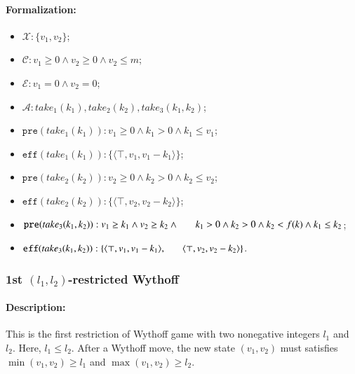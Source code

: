 \documentclass[review]{elsarticle}
\newcommand{\set}[1]{\{ #1 \}}
\newcommand{\tuple}[1]{\langle {#1} \rangle}
\newcommand{\true}{\top}
\newcommand{\statevar}{\mathcal{X}}
\newcommand{\act}{\mathcal{A}}
\newcommand{\constraint}{\mathcal{C}}
\newcommand{\estate}{\mathcal{E}}
\newcommand{\pre}{\mathtt{pre}}
\newcommand{\eff}{\mathtt{eff}}
\begin{document}
\paragraph{Formalization:}
\begin{itemize}
	\item $\statevar: \set{v_1, v_2}$;
	\item $\constraint: v_1 \ge 0 \wedge v_2 \ge 0 \wedge v_2 \le m$;
	\item $\estate: v_1=0 \wedge v_2 = 0$;
	\item $\act:take_1(k_1), take_2(k_2), take_3(k_1,k_2)$;
	\item $\pre(take_1(k_1)) : v_1 \ge 0 \wedge k_1 > 0 \wedge k_1 \le v_1$;
	\item $\eff(take_1(k_1)) : \set{\tuple{\true, v_1, v_1-k_1}}$;
	\item $\pre(take_2(k_2)) : v_2 \ge 0 \wedge k_2 > 0 \wedge k_2 \le v_2$;
	\item $\eff(take_2(k_2)) : \set{\tuple{\true, v_2, v_2-k_2}}$;
	\item $\pre(take_3(k_1, k_2)) : v_1 \ge k_1 \wedge v_2 \ge k_2 \wedge \\ \hspace*{6mm}
	k_1 > 0 \wedge k_2 > 0\wedge k_2 < f(k) \wedge k_1 \le k_2$;
	\item $\eff(take_3(k_1, k_2)) : \set{\tuple{\true, v_1, v_1 -k_1},\\ \hspace*{6mm}
		\tuple{\true, v_2, v_2 - k_2}}$.
\end{itemize}



\subsubsection{1st $(l_1, l_2)$-restricted Wythoff \protect\cite{FraH2014}}

\paragraph{Description:} 
This is the first restriction of Wythoff game with two nonegative integers $l_1$ and $l_2$.
Here, $l_1 \le l_2$.
After a Wythoff move, the new state $(v_1, v_2)$ must satisfies $\min(v_1, v_2) \ge l_1$ and $\max(v_1, v_2) \ge l_2$.

\end{document}
